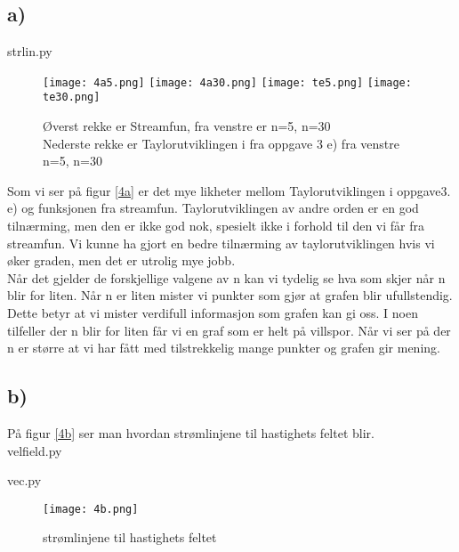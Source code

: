 \documentclass[a4paper,12pt,norsk]{article}
\begin{document}
\subsection{a)}
strlin.py

\begin{figure}[h!]
\texttt{[image: 4a5.png]} 
\texttt{[image: 4a30.png]} 
\texttt{[image: te5.png]} 
\texttt{[image: te30.png]} 
\caption{Øverst rekke er Streamfun, fra venstre er n=5, n=30\\ Nederste rekke er Taylorutviklingen i fra oppgave 3 e) fra venstre n=5, n=30}
\label{4a}
\end{figure} 
Som vi ser på figur \vref{4a} er det mye likheter mellom Taylorutviklingen i oppgave3. e) og funksjonen fra streamfun. Taylorutviklingen av andre orden er en god tilnærming, men den er ikke god nok, spesielt ikke i forhold til den vi får fra streamfun. Vi kunne ha gjort en bedre tilnærming av taylorutviklingen hvis vi øker graden, men det er utrolig mye jobb. \\
Når det gjelder de forskjellige valgene av n kan vi tydelig se hva som skjer når n blir for liten. Når n er liten mister vi punkter som gjør at grafen blir ufullstendig. Dette betyr at vi mister verdifull informasjon som grafen kan gi oss. I noen tilfeller der n blir for liten får vi en graf som er helt på villspor. Når vi ser på der n er større at vi har fått med tilstrekkelig mange punkter og grafen gir mening.

\subsection{b)}
På figur \vref{4b} ser man hvordan strømlinjene til hastighets feltet blir.\\
velfield.py

vec.py


\begin{figure}[h!]
\texttt{[image: 4b.png]}
 \caption{strømlinjene til hastighets feltet}
\label{4b}
\end{figure} 
\end{document}
